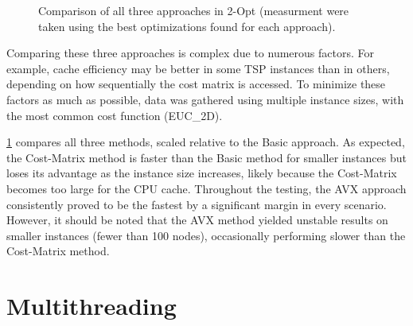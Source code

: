 \begin{figure}[htbp]
    \centering
    \caption{Comparison of all three approaches in 2-Opt (measurment were taken using the best optimizations found for each approach).} \label{fig:avxShowcase}
\end{figure}

Comparing these three approaches is complex due to numerous factors.
For example, cache efficiency may be better in some TSP instances than in others, depending on how sequentially the cost matrix is accessed.
To minimize these factors as much as possible, data was gathered using multiple instance sizes, with the most common cost function (EUC\_2D).

\figurename{ \ref{fig:avxShowcase}} compares all three methods, scaled relative to the Basic approach.
As expected, the Cost-Matrix method is faster than the Basic method for smaller instances but loses its advantage as the instance size increases, likely because the Cost-Matrix becomes too large for the CPU cache.
Throughout the testing, the AVX approach consistently proved to be the fastest by a significant margin in every scenario.
However, it should be noted that the AVX method yielded unstable results on smaller instances (fewer than 100 nodes), occasionally performing slower than the Cost-Matrix method.

\section{Multithreading}

